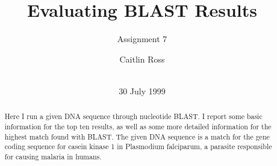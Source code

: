 \documentclass{acm_proc_article-sp}
\begin{document}
\title{Evaluating BLAST Results}
\subtitle{Assignment 7}
%
%
%
%
%

%
\author{
	\alignauthor Caitlin Ross\\
	 \\
}

\date{30 July 1999}

\maketitle

\begin{abstract}
Here I run a given DNA sequence through nucleotide BLAST.  I report some basic information for the top ten results, as well as some more detailed information for the highest match found with BLAST.  The given DNA sequence is a match for the gene coding sequence for casein kinase 1 in Plasmodium falciparum, a parasite responsible for causing malaria in humans.  

\end{abstract}
\end{document}
